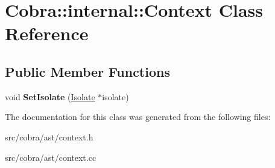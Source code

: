 \hypertarget{class_cobra_1_1internal_1_1_context}{\section{Cobra\+:\+:internal\+:\+:Context Class Reference}
\label{class_cobra_1_1internal_1_1_context}
}
\subsection*{Public Member Functions}
\begin{DoxyCompactItemize}
\item 
\hypertarget{class_cobra_1_1internal_1_1_context_a9ce99f725452c20315f88c9fb0328baa}{void {\bfseries Set\+Isolate} (\hyperlink{class_cobra_1_1internal_1_1_isolate}{Isolate} $\ast$isolate)}\label{class_cobra_1_1internal_1_1_context_a9ce99f725452c20315f88c9fb0328baa}

\end{DoxyCompactItemize}


The documentation for this class was generated from the following files\+:\begin{DoxyCompactItemize}
\item 
src/cobra/ast/context.\+h\item 
src/cobra/ast/context.\+cc\end{DoxyCompactItemize}
